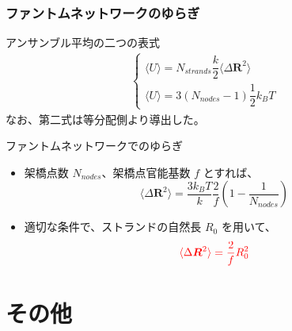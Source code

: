 \documentclass[12pt, dvipdfmx]{beamer}
\begin{document}
\begin{frame}
	\frametitle{ファントムネットワークのゆらぎ}
		\begin{block}{アンサンブル平均の二つの表式}
			\vspace{-5mm}
			\scriptsize
			\begin{align*}
				\begin{cases}
					\langle U \rangle = N_{strands} \dfrac{k}{2} \langle \Delta \bm{R}^2 \rangle \\
					\langle U \rangle = 3(N_{nodes}-1) \dfrac{1}{2} k_B T
				\end{cases}
			\end{align*}
			\normalsize
			なお、第二式は等分配側より導出した。
		\end{block}
		\begin{exampleblock}{ファントムネットワークでのゆらぎ}
			\begin{itemize}
				\item 架橋点数 $N_{nodes}$、架橋点官能基数 $f$ とすれば、
					\scriptsize
					\begin{equation*}
					\langle \Delta \bm{R}^2 \rangle = \dfrac{3k_B T}{k} \dfrac{2}{f} \left( 1-\dfrac{1}{N_{nodes}} \right)
					\end{equation*}
					\normalsize
				\item 適切な条件で、ストランドの自然長 $R_0$ を用いて、
					\scriptsize
					\begin{equation*}
					\color{red}
					\langle \Delta \bm{R}^2 \rangle = \dfrac{2}{f} R_0^2
					\end{equation*}
					\normalsize
			\end{itemize}
		\end{exampleblock}
\end{frame}

\section{その他}
\end{document}
